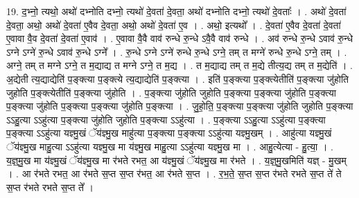 \documentclass[17pt]{extarticle}
\begin{document}
19. द॒भ्नो॒ त्यथो॒ अथो॑ दभ्नोति दभ्नो॒ त्यथो॑ दे॒वता॑ दे॒वता॒ अथो॑ दभ्नोति दभ्नो॒ त्यथो॑ दे॒वताः᳚ । . अथो॑ दे॒वता॑ दे॒वता॒ अथो॒ अथो॑ दे॒वता॑ ए॒वैव दे॒वता॒ अथो॒ अथो॑ दे॒वता॑ ए॒व । . अथो॒ इत्यथो᳚ । . दे॒वता॑ ए॒वैव दे॒वता॑ दे॒वता॑ ए॒वावा वै॒व दे॒वता॑ दे॒वता॑ ए॒वाव॑ । . ए॒वावा वै॒वै वाव॑ रुन्धे रु॒न्धे ऽवै॒वै वाव॑ रुन्धे । . अव॑ रुन्धे रु॒न्धे ऽवाव॑ रु॒न्धे ऽग्ने ऽग्ने॑ रु॒न्धे ऽवाव॑ रु॒न्धे ऽग्ने᳚ । . रु॒न्धे ऽग्ने ऽग्ने॑ रुन्धे रु॒न्धे ऽग्ने॒ तम् त मग्ने॑ रुन्धे रु॒न्धे ऽग्ने॒ तम् । . अग्ने॒ तम् त मग्ने ऽग्ने॒ त म॒द्याद्य त मग्ने ऽग्ने॒ त म॒द्य । . त म॒द्याद्य तम् त म॒द्ये तीत्य॒द्य तम् त म॒द्येति॑ । . अ॒द्येती त्य॒द्याद्येति॑ प॒ङ्क्त्या प॒ङ्क्त्ये त्य॒द्याद्येति॑ प॒ङ्क्त्या । . इति॑ प॒ङ्क्त्या प॒ङ्क्त्येतीति॑ प॒ङ्क्त्या जु॑होति जुहोति प॒ङ्क्त्येतीति॑ प॒ङ्क्त्या जु॑होति । . प॒ङ्क्त्या जु॑होति जुहोति प॒ङ्क्त्या प॒ङ्क्त्या जु॑होति प॒ङ्क्त्या प॒ङ्क्त्या जु॑होति प॒ङ्क्त्या प॒ङ्क्त्या जु॑होति प॒ङ्क्त्या । . जु॒हो॒ति॒ प॒ङ्क्त्या प॒ङ्क्त्या जु॑होति जुहोति प॒ङ्क्त्या ऽऽहु॒त्या ऽऽहु॑त्या प॒ङ्क्त्या जु॑होति जुहोति प॒ङ्क्त्या ऽऽहु॑त्या । . प॒ङ्क्त्या ऽऽहु॒त्या ऽऽहु॑त्या प॒ङ्क्त्या प॒ङ्क्त्या ऽऽहु॑त्या यज्ञ्मु॒खं ॅय॑ज्ञ्मु॒ख माहु॑त्या प॒ङ्क्त्या प॒ङ्क्त्या ऽऽहु॑त्या यज्ञ्मु॒खम् । . आहु॑त्या यज्ञ्मु॒खं ॅय॑ज्ञ्मु॒ख माहु॒त्या ऽऽहु॑त्या यज्ञ्मु॒ख मा य॑ज्ञ्मु॒ख माहु॒त्या ऽऽहु॑त्या यज्ञ्मु॒ख मा । . आहु॒त्येत्या - हु॒त्या॒ । . य॒ज्ञ्॒मु॒ख मा य॑ज्ञ्मु॒खं ॅय॑ज्ञ्मु॒ख मा र॑भते रभत॒ आ य॑ज्ञ्मु॒खं ॅय॑ज्ञ्मु॒ख मा र॑भते । . य॒ज्ञ्॒मु॒खमिति॑ यज्ञ् - मु॒खम् । . आ र॑भते रभत॒ आ र॑भते स॒प्त स॒प्त र॑भत॒ आ र॑भते स॒प्त । . र॒भ॒ते॒ स॒प्त स॒प्त र॑भते रभते स॒प्त ते॑ ते स॒प्त र॑भते रभते स॒प्त ते᳚ । \newline
\end{document}
